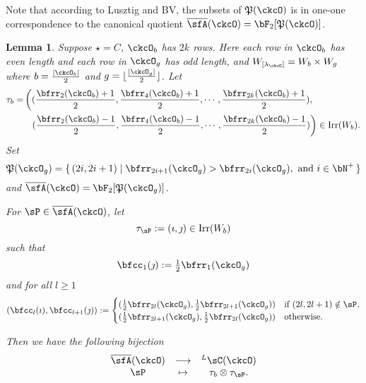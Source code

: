 \documentclass[12pt,a4paper]{amsart}
\def\abs#1{\left|{#1}\right|}
\newcommand{\CQ}{{\mathcal {Q}}}
\numberwithin{equation}{section}
\newtheorem{lem}[thm]{Lemma}
\theoremstyle{remark}
\def\half{{\tfrac{1}{2}}}
\def\floor#1{{\lfloor #1 \rfloor}}
\def\Irr{\mathrm{Irr}}
\def\WLamck{W_{[\lambda_{\ckcO}]}}
\def\LC{{}^L\sC}
\def\CQ{\overline{\sfA}}%
\def\CPP{\mathfrak{P}}
\begin{document}
{Note that according to Lusztig and BV, the subsets of $\CPP(\ckcO)$ is in
one-one correspondence to the canonical quotient $\CQ(\ckcO) = \bF_{2}[\CPP(\ckcO)]$.


}


\begin{lem}
  Suppose $\star = C$, $\ckcO_{b}$ has $2k$ rows. Here each row in $\ckcO_{b}$ has
  even length and each row in $\ckcO_{g}$ has odd length, and
  $\WLamck = W_{b}\times W_{g}$ where $b= \frac{\abs{\ckcO_{b}}}{2}$ and
  $g = \floor{\frac{\abs{\ckcO_{g}}}{2}}$.
  Let
  \[
    \begin{split}
      \tau_{b} =  & \left( (\frac{\bfrr_{2}(\ckcO_{b})+1}{2}, \frac{\bfrr_{4}(\ckcO_{b})+1}{2}, \cdots, \frac{\bfrr_{2k}(\ckcO_{b})+1}{2}),\right.\\
        &\ \ \left. (\frac{\bfrr_{2}(\ckcO_{b})-1}{2}, \frac{\bfrr_{4}(\ckcO_{b})-1}{2}, \cdots, \frac{\bfrr_{2k}(\ckcO_{b})-1}{2})\right) \in \Irr(W_{b}).
    \end{split}
  \]
  Set
  \[
    \CPP(\ckcO_{g}) = \set{(2i,2i+1)| \bfrr_{2i+1}(\ckcO_{g})> \bfrr_{2i}(\ckcO_{g}), \text{
        and } i\in \bN^{+}}
  \]
  and $\CQ(\ckcO)= \bF_{2}[\CPP(\ckcO_{g})]$.

  For $\sP \in \CQ(\ckcO)$, let
  \[
    \tau_{\sP} := (\imath,\jmath) \in \Irr(W_{b})
  \]
  such that
  \[
    \bfcc_{1}(\jmath)  := \half\bfrr_{1}(\ckcO_{g})
  \]
  and for all $l\geq 1$
  \[
  (\bfcc_{l}(\imath), \bfcc_{l+1}(\jmath)):=
  \begin{cases}
    (\half \bfrr_{2l}(\ckcO_{g}), \half \bfrr_{2l+1}(\ckcO_{g}))
    & \text{if } (2l,2l+1)\notin \sP,\\
    (\half \bfrr_{2l+1}(\ckcO_{g}),\half \bfrr_{2l}(\ckcO_{g})) & \text{otherwise.}
  \end{cases}
  \]

  Then we have the following bijection
  \[
    \begin{array}{ccc}
      \CQ(\ckcO) &\longrightarrow & \LC(\ckcO)\\
      \sP & \mapsto & \tau_{b}\otimes \tau_{\sP}.
    \end{array}
  \]
\end{lem}
\end{document}
